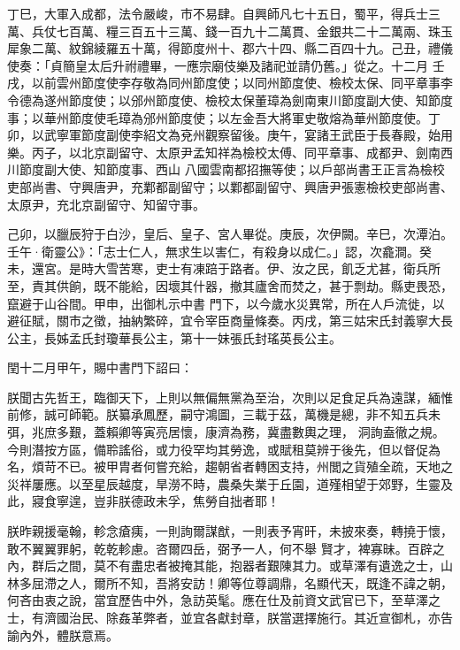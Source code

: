 \begin{pinyinscope}
 丁巳，大軍入成都，法令嚴峻，市不易肆。自興師凡七十五日，蜀平，得兵士三萬、兵仗七百萬、糧三百五十三萬、錢一百九十二萬貫、金銀共二十二萬兩、珠玉犀象二萬、紋錦綾羅五十萬，得節度州十、郡六十四、縣二百四十九。己丑，禮儀使奏：「貞簡皇太后升祔禮畢，一應宗廟伎樂及諸祀並請仍舊。」從之。十二月
 壬戌，以前雲州節度使李存敬為同州節度使；以同州節度使、檢校太保、同平章事李令德為遂州節度使；以邠州節度使、檢校太保董璋為劍南東川節度副大使、知節度事；以華州節度使毛璋為邠州節度使；以左金吾大將軍史敬熔為華州節度使。丁卯，以武寧軍節度副使李紹文為兗州觀察留後。庚午，宴諸王武臣于長春殿，始用樂。丙子，以北京副留守、太原尹孟知祥為檢校太傅、同平章事、成都尹、劍南西川節度副大使、知節度事、西山
 八國雲南都招撫等使；以戶部尚書王正言為檢校吏部尚書、守興唐尹，充鄴都副留守；以鄴都副留守、興唐尹張憲檢校吏部尚書、太原尹，充北京副留守、知留守事。



 己卯，以臘辰狩于白沙，皇后、皇子、宮人畢從。庚辰，次伊闕。辛巳，次潭泊。壬午·衛靈公》：「志士仁人，無求生以害仁，有殺身以成仁。」認，次龕澗。癸未，還宮。是時大雪苦寒，吏士有凍踣于路者。伊、汝之民，飢乏尤甚，衛兵所至，責其供餉，既不能給，因壞其什器，撤其廬舍而焚之，甚于剽劫。縣吏畏恐，竄避于山谷間。甲申，出御札示中書
 門下，以今歲水災異常，所在人戶流徙，以避征賦，關市之徵，抽納繁碎，宜令宰臣商量條奏。丙戌，第三姑宋氏封義寧大長公主，長姊孟氏封瓊華長公主，第十一妹張氏封瑤英長公主。



 閏十二月甲午，賜中書門下詔曰：



 朕聞古先哲王，臨御天下，上則以無偏無黨為至治，次則以足食足兵為遠謀，緬惟前修，誠可師範。朕纂承鳳歷，嗣守鴻圖，三載于茲，萬機是總，非不知五兵未弭，兆庶多艱，蓋賴卿等寅亮居懷，康濟為務，冀盡數輿之理，
 洞詢盍徹之規。今則潛按方區，備聆謠俗，或力役罕均其勞逸，或賦租莫辨于後先，但以督促為名，煩苛不已。被甲胄者何嘗充給，趨朝省者轉困支持，州閭之貨殖全疏，天地之災祥屢應。以至星辰越度，旱澇不時，農桑失業于丘園，道殣相望于郊野，生靈及此，寢食寧遑，豈非朕德政未孚，焦勞自拙者耶！



 朕昨親援毫翰，軫念瘡痍，一則詢爾謀猷，一則表予宵旰，未披來奏，轉撓于懷，敢不翼翼罪躬，乾乾軫慮。咨爾四岳，弼予一人，何不舉
 賢才，裨寡昧。百辟之內，群后之間，莫不有盡忠者被掩其能，抱器者艱陳其力。或草澤有遺逸之士，山林多屈滯之人，爾所不知，吾將安訪！卿等位尊調鼎，名顯代天，既逢不諱之朝，何吝由衷之說，當宜歷告中外，急訪英髦。應在仕及前資文武官已下，至草澤之士，有濟國治民、除姦革弊者，並宜各獻封章，朕當選擇施行。其近宣御札，亦告諭內外，體朕意焉。




\end{pinyinscope}
